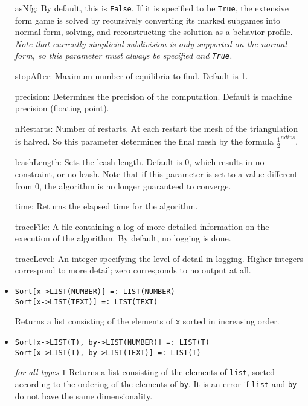 \begin{itemize}
\bd
\item
[asNfg:] By default, this is \verb+False+.  If it is specified to be
\verb+True+, the extensive form game is solved by recursively converting
its marked subgames into normal form, solving, and reconstructing the
solution as a behavior profile.  {\it Note that currently simplicial
subdivision is only supported on the normal form, so this parameter
must always be specified and {\tt True}.}
\item
[stopAfter:] Maximum number of equilibria to find. Default is 1.  
\item
[precision:] Determines the precision of the computation. Default is
machine precision (floating point). 
\item 
[nRestarts:] Number of restarts.  At each restart the mesh of the
triangulation is halved.  So this parameter determines the final mesh
by the formula $\frac{1}{2}^{ndivs}$.
\item
[leashLength:] Sets the leash length. Default is 0, which results in no
constraint, or no leash.  Note that if this parameter is set to a value
different from 0, the algorithm is no longer guaranteed to converge.
\item
[time:] Returns the elapsed time for the algorithm.
\item
[traceFile:] A file containing a log of more detailed information on the
execution of the algorithm.  By default, no logging is done.
\item
[traceLevel:] An integer specifying the level of detail in logging.
Higher integers correspond to more detail; zero corresponds to
no output at all.
\ed
\ed

\item{}
\protect \large \begin{verbatim}
Sort[x->LIST(NUMBER)] =: LIST(NUMBER)
Sort[x->LIST(TEXT)] =: LIST(TEXT)
\end{verbatim} \normalsize

\bd
Returns a list consisting of the elements of \verb+x+ sorted in
increasing order.
\ed

\item{}
\protect \large \begin{verbatim}
Sort[x->LIST(T), by->LIST(NUMBER)] =: LIST(T)
Sort[x->LIST(T), by->LIST(TEXT)] =: LIST(T)
\end{verbatim} \normalsize

{\it for all types} {\tt T}
\bd
Returns a list consisting of the elements of \verb+list+, sorted
according to the ordering of the elements of \verb+by+.  It is an
error if \verb+list+ and \verb+by+ do not have the same dimensionality.
\ed


\end{itemize}
